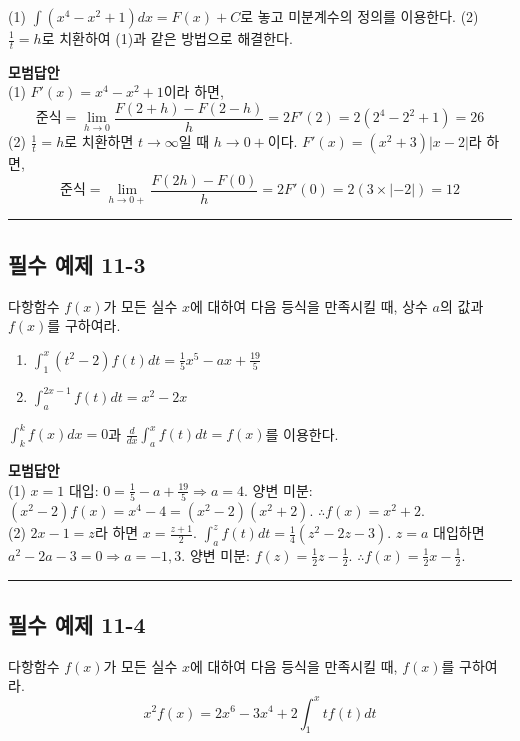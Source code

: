 \documentclass[a4paper,11pt]{article}
\begin{document}
\begin{studybox}
(1) $\int (x^{4}-x^{2}+1) dx = F(x) + C$로 놓고 미분계수의 정의를 이용한다.
(2) $\frac{1}{t} = h$로 치환하여 (1)과 같은 방법으로 해결한다.
\end{studybox}

\textbf{모범답안} \\
(1) $F'(x) = x^{4} - x^{2} + 1$이라 하면,
\[ \text{준식} = \lim_{h \to 0} \frac{F(2+h) - F(2-h)}{h} = 2F'(2) = 2(2^4 - 2^2 + 1) = 26 \]
(2) $\frac{1}{t}=h$로 치환하면 $t \to \infty$일 때 $h \to 0+$이다. $F'(x) = (x^2+3)|x-2|$라 하면,
\[ \text{준식} = \lim_{h \to 0+} \frac{F(2h) - F(0)}{h} = 2F'(0) = 2(3 \times |-2|) = 12 \]

\vspace{0.5cm}
\hrule
\vspace{0.5cm}

\subsection*{필수 예제 11-3}
다항함수 $f(x)$가 모든 실수 $x$에 대하여 다음 등식을 만족시킬 때, 상수 $a$의 값과 $f(x)$를 구하여라. 
\begin{enumerate}
    \item $\displaystyle \int_{1}^{x} (t^{2}-2)f(t) dt = \frac{1}{5}x^{5} - ax + \frac{19}{5}$ 
    \item $\displaystyle \int_{a}^{2x-1} f(t) dt = x^{2} - 2x$ 
\end{enumerate}

\begin{studybox} 
$\int_{k}^{k} f(x) dx = 0$과 $\frac{d}{dx} \int_{a}^{x} f(t) dt = f(x)$를 이용한다.
\end{studybox}

\textbf{모범답안} \\
(1) $x=1$ 대입: $0 = \frac{1}{5} - a + \frac{19}{5} \Rightarrow a = 4$. 양변 미분: $(x^{2}-2)f(x) = x^{4}-4 = (x^{2}-2)(x^{2}+2)$. $\therefore f(x) = x^{2}+2$.\\
(2) $2x-1=z$라 하면 $x = \frac{z+1}{2}$. $\int_{a}^{z} f(t) dt = \frac{1}{4}(z^2-2z-3)$. $z=a$ 대입하면 $a^2-2a-3=0 \Rightarrow a=-1, 3$. 양변 미분: $f(z) = \frac{1}{2}z - \frac{1}{2}$. $\therefore f(x) = \frac{1}{2}x - \frac{1}{2}$.

\vspace{0.5cm}
\hrule
\vspace{0.5cm}

\subsection*{필수 예제 11-4}
다항함수 $f(x)$가 모든 실수 $x$에 대하여 다음 등식을 만족시킬 때, $f(x)$를 구하여라.
\[ x^{2} f(x) = 2x^{6} - 3x^{4} + 2 \int_{1}^{x} tf(t) dt \]
\end{document}
